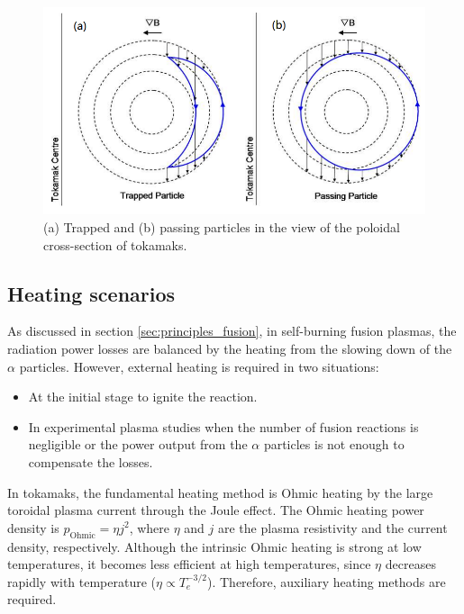 \begin{figure}[h]
\begin{centering}
\includegraphics[scale=0.5]{trapped_particles.png}
\par\end{centering}
\caption{(a) Trapped and (b) passing particles in the view of the poloidal cross-section of tokamaks.}
\label{fig:trapped_particles}
\end{figure}


\subsection{Heating scenarios}

As discussed in section \ref{sec:principles_fusion}, in self-burning fusion plasmas, the radiation power losses are balanced by the heating from the slowing down of the $\alpha$ particles. However, external heating is required in two situations:%
\begin{itemize}

  \item At the initial stage to ignite the reaction.

  \item In experimental plasma studies when the number of fusion reactions is negligible or the power output from the $\alpha$ particles is not enough to compensate the losses.

\end{itemize}
\noindent In tokamaks, the fundamental heating method is Ohmic heating by the large toroidal plasma current through the Joule effect. The Ohmic heating power density is $p_{\mathrm{Ohmic}} = \eta j^2$, where $\eta$ and $j$ are the plasma resistivity and the current density, respectively. Although the intrinsic Ohmic heating is strong at low temperatures, it becomes less efficient at high temperatures, since $\eta$ decreases rapidly with temperature ($\eta \propto T_e^{-3/2}$). Therefore, auxiliary heating methods are required.


